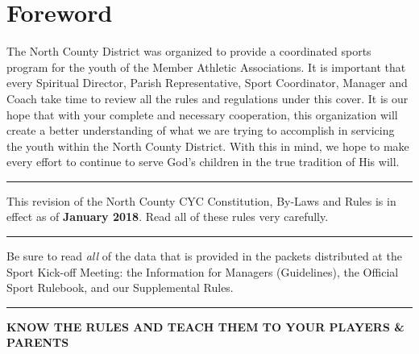 \chapter{Foreword}
The North County District was organized to provide a coordinated sports program for the youth of the Member Athletic Associations.  It is important that every Spiritual Director, Parish Representative, Sport Coordinator, Manager and Coach take time to review all the rules and regulations under this cover.  It is our hope that with your complete and necessary cooperation, this organization will create a better understanding of what we are trying to accomplish in servicing the youth within the North County District.  With this in mind, we hope to make every effort to continue to serve God's children in the true tradition of His will.
\plainbreak{4}
This revision of the North County CYC Constitution, By-Laws and Rules is in effect as of \textbf{January 2018}.  
Read all of these rules very carefully.  
\plainbreak{4}
Be sure to read {\em all} of the data that is provided in the packets distributed at the Sport Kick-off Meeting:  the Information for Managers (Guidelines), the Official Sport Rulebook, and our Supplemental Rules.
\plainbreak{4}
\textbf{KNOW THE RULES AND TEACH THEM TO YOUR PLAYERS \& PARENTS}
